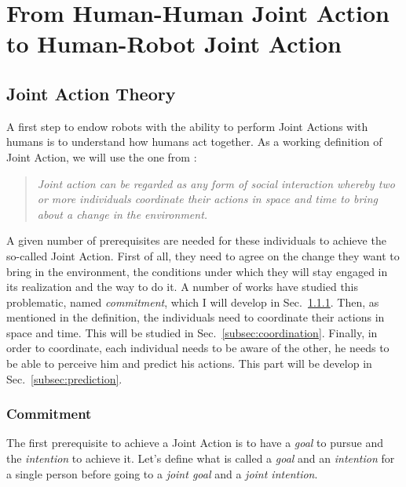 \documentclass[english,a4paper,11pt,twoside]{StyleThese}
\begin{document}
\setcounter{chapter}{0} %
\dominitoc
\faketableofcontents
\fi

\chapter{From Human-Human Joint Action to Human-Robot Joint Action}
\minitoc

\section{Joint Action Theory}

A first step to endow robots with the ability to perform Joint Actions with humans is to understand how humans act together. As a working definition of Joint Action, we will use the one from \cite{sebanz2006joint}:

\begin{quote}
\textit{Joint action can be regarded as any form of social interaction whereby two or more individuals coordinate their actions in space and time to bring about a change in the environment.}
\end{quote}

A given number of prerequisites are needed for these individuals to achieve the so-called Joint Action. First of all, they need to agree on the change they want to bring in the environment, the conditions under which they will stay engaged in its realization and the way to do it. A number of works have studied this problematic, named \textit{commitment}, which I will develop in Sec.~\ref{subsec:commitment}. Then, as mentioned in the definition, the individuals need to coordinate their actions in space and time. This will be studied in Sec.~\ref{subsec:coordination}. Finally, in order to coordinate, each individual needs to be aware of the other, he needs to be able to perceive him and predict his actions. This part will be develop in Sec.~\ref{subsec:prediction}.

\subsection{Commitment}

\label{subsec:commitment}

The first prerequisite to achieve a Joint Action is to have a \textit{goal} to pursue and the \textit{intention} to achieve it. Let's define what is called a \textit{goal} and an \textit{intention} for a single person before going to a \textit{joint goal} and a \textit{joint intention}.
\end{document}
